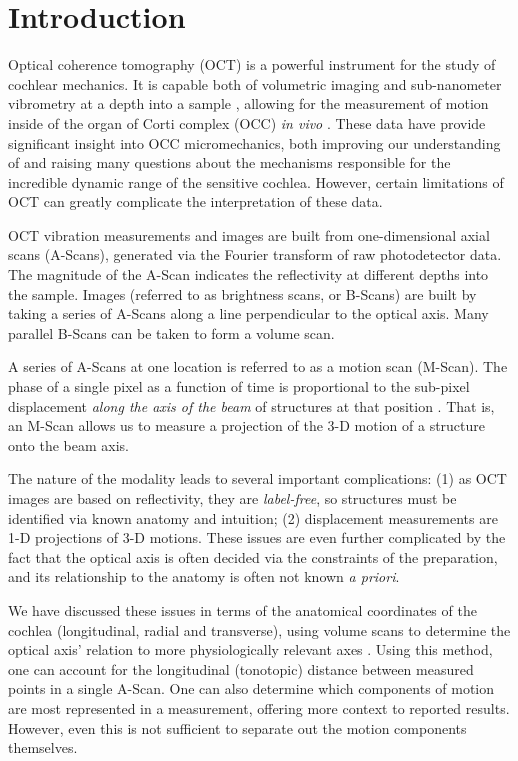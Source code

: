 \documentclass[preprint,NumberedRefs]{JASA}
\begin{document}
\section{Introduction}
\par{Optical coherence tomography (OCT) is a powerful instrument for the study of cochlear mechanics. It is capable both of volumetric imaging and sub-nanometer vibrometry at a depth into a sample \citep{OCTtheory,sdpm}, allowing for the measurement of motion inside of the organ of Corti complex (OCC) \textit{in vivo} \citep{gao,dongoghalai,fallah,strimbu2020,fangyi,lee,cooper}. These data have provide significant insight into OCC micromechanics, both improving our understanding of and raising many questions about the mechanisms responsible for the incredible dynamic range of the sensitive cochlea. However, certain limitations of OCT can greatly complicate the interpretation of these data.}
\par{OCT vibration measurements and images are built from one-dimensional axial scans (A-Scans), generated via the Fourier transform of raw photodetector data. The magnitude of the A-Scan indicates the reflectivity at different depths into the sample. Images (referred to as brightness scans, or B-Scans) are built by taking a series of A-Scans along a line perpendicular to the optical axis. Many parallel B-Scans can be taken to form a volume scan.}
\par{A series of A-Scans at one location is referred to as a motion scan (M-Scan). The phase of a single pixel as a function of time is proportional to the sub-pixel displacement \textit{along the axis of the beam} of structures at that position \citep{sdpm}. That is, an M-Scan allows us to measure a projection of the 3-D motion of a structure onto the beam axis.}
\par{The nature of the modality leads to several important complications: (1) as OCT images are based on reflectivity, they are \textit{label-free}, so structures must be identified via known anatomy and intuition; (2) displacement measurements are 1-D projections of 3-D motions. These issues are even further complicated by the fact that the optical axis is often decided via the constraints of the preparation, and its relationship to the anatomy is often not known \textit{a priori}.}
\par{We have discussed these issues in terms of the anatomical coordinates of the cochlea (longitudinal, radial and transverse), using volume scans to determine the optical axis' relation to more physiologically relevant axes \citep{frost2022}. Using this method, one can account for the longitudinal (tonotopic) distance between measured points in a single A-Scan. One can also determine which components of motion are most represented in a measurement, offering more context to reported results. However, even this is not sufficient to separate out the motion components themselves.}
\end{document}
